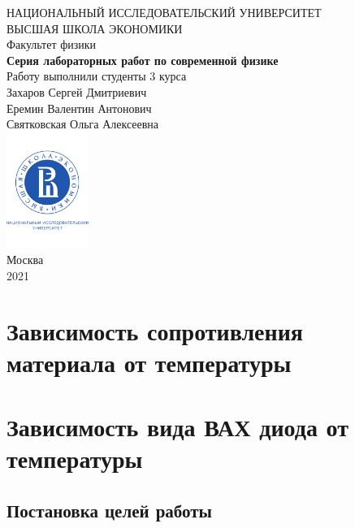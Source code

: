 \documentclass[a4paper, 12pt]{article}
\begin{document}
	\begin{titlepage}
		\begin{center}
			$$$$
			$$$$
			$$$$
			$$$$
			{\Large{НАЦИОНАЛЬНЫЙ ИССЛЕДОВАТЕЛЬСКИЙ УНИВЕРСИТЕТ}}\\
			\vspace{0.1cm}
			{\Large{ВЫСШАЯ ШКОЛА ЭКОНОМИКИ}}\\
			\vspace{0.25cm}
			{\large{Факультет физики}}\\
			\vspace{5.5cm}
			{\Huge\textbf{{Серия лабораторных работ по современной физике}}}\\%
			\vspace{1cm}
			{Работу выполнили студенты 3 курса}\\
			{Захаров Сергей Дмитриевич}\\
			{Еремин Валентин Антонович}\\
			{Святковская Ольга Алексеевна}\\
			\vfill
			\includegraphics[width = 0.2\textwidth]{HSElogo}\\
			\vfill
			Москва\\
			2021
		\end{center}
	\end{titlepage}
	
\tableofcontents

\newpage

\section{Зависимость сопротивления материала от температуры}

\section{Зависимость вида ВАХ диода от температуры}

\subsection{Постановка целей работы}
\end{document}
